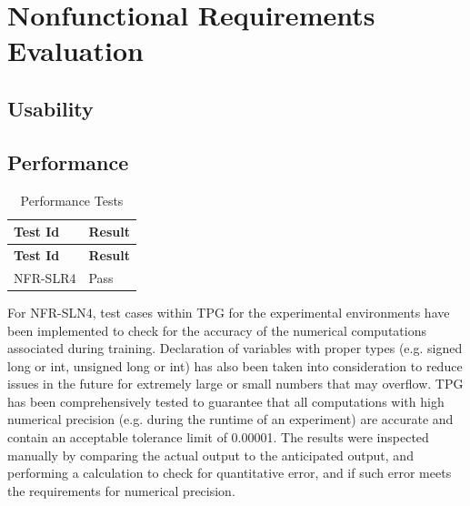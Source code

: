 \documentclass[12pt, titlepage]{article}
\begin{document}
\section{Nonfunctional Requirements Evaluation}

\subsection{Usability}\label{usability}
		
\subsection{Performance}\label{performance}

\begin{center}
  \begin{longtable}{|p{4cm}|p{4cm}|}
  \caption{Performance Tests} \\
  \hline
  \textbf{Test Id} & \textbf{Result} \\
  \hline
  \endfirsthead
  \hline
  \textbf{Test Id} & \textbf{Result} \\
  \hline
  \endhead
  NFR-SLR4 & Pass \\
  \hline
  \end{longtable}
\end{center}

For NFR-SLN4, test cases within TPG for the experimental environments have been implemented to check for the accuracy of the numerical computations associated during training. Declaration of variables with proper types (e.g. signed long or int, unsigned long or int) has also been taken into consideration to reduce issues in the future for extremely large or small numbers that may overflow. TPG has been comprehensively tested to guarantee that all computations with high numerical precision (e.g. during the runtime of an experiment) are accurate and contain an acceptable tolerance limit of 0.00001. The results were inspected manually by comparing the actual output to the anticipated output, and performing a calculation to check for quantitative error, and if such error meets the requirements for numerical precision.
\end{document}
